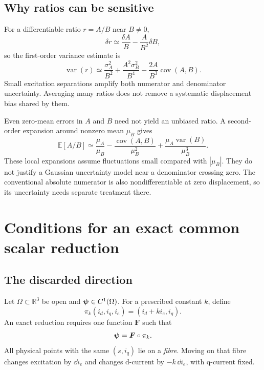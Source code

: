 \subsection{Why ratios can be sensitive}
For a differentiable ratio $r=A/B$ near $B\ne0$,
\begin{equation}\label{eq:ratio-uncertainty}
\delta r\simeq\frac{\delta A}{B}-\frac{A}{B^2}\delta B,
\end{equation}
so the first-order variance estimate is
\begin{equation}
\operatorname{var}(r)\simeq
\frac{\sigma_A^2}{B^2}
+\frac{A^2\sigma_B^2}{B^4}
-\frac{2A}{B^3}\operatorname{cov}(A,B).
\end{equation}
Small excitation separations amplify both numerator and denominator uncertainty. Averaging many ratios does not remove a systematic displacement bias shared by them.

Even zero-mean errors in $A$ and $B$ need not yield an unbiased ratio. A second-order expansion around nonzero mean $\mu_B$ gives
\begin{equation}
\mathbb E[A/B]\simeq
\frac{\mu_A}{\mu_B}
-\frac{\operatorname{cov}(A,B)}{\mu_B^2}
+\frac{\mu_A\operatorname{var}(B)}{\mu_B^3}.
\end{equation}
These local expansions assume fluctuations small compared with $|\mu_B|$. They do not justify a Gaussian uncertainty model near a denominator crossing zero. The conventional absolute numerator is also nondifferentiable at zero displacement, so its uncertainty needs separate treatment there.

\section{Conditions for an exact common scalar reduction}
\subsection{The discarded direction}
Let $\Omega\subset\mathbb R^3$ be open and $\bm\psi\in C^1(\Omega)$. For a prescribed constant $k$, define
\begin{equation}
\pi_k(i_d,i_q,i_e)=(i_d+k i_e,i_q).
\end{equation}
An exact reduction requires one function $\bm F$ such that
\begin{equation}\label{eq:exact-factorization}
\bm\psi=\bm F\circ\pi_k.
\end{equation}
All physical points with the same $(s,i_q)$ lie on a \emph{fibre}. Moving on that fibre changes excitation by $\dd i_e$ and changes d-current by $-k\,\dd i_e$, with q-current fixed.

